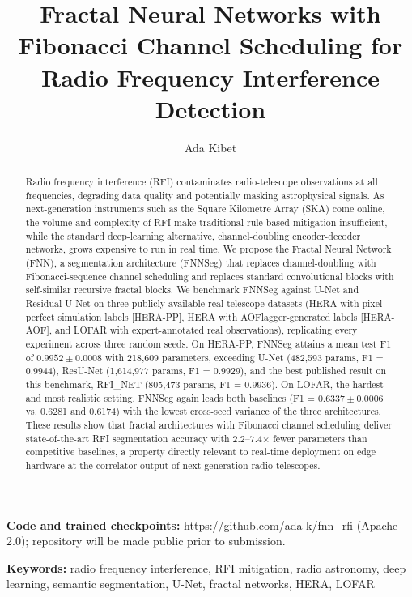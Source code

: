 \documentclass[11pt]{article}
\title{Fractal Neural Networks with Fibonacci Channel Scheduling for Radio Frequency Interference Detection}
\author[1]{Ada Kibet}
\affil[1]{University of East London, u2647143@uel.ac.uk, adakibet@gmail.com, ORCID: \href{https://orcid.org/0009-0002-0809-8738}{0009-0002-0809-8738}}
\date{}
\begin{document}
\maketitle

\noindent \textbf{Code and trained checkpoints:} \url{https://github.com/ada-k/fnn_rfi} (Apache-2.0); repository will be made public prior to submission.

\begin{abstract}
Radio frequency interference (RFI) contaminates radio-telescope observations at all frequencies, degrading data quality and potentially masking astrophysical signals. As next-generation instruments such as the Square Kilometre Array (SKA) come online, the volume and complexity of RFI make traditional rule-based mitigation insufficient, while the standard deep-learning alternative, channel-doubling encoder-decoder networks, grows expensive to run in real time. We propose the Fractal Neural Network (FNN), a segmentation architecture (FNNSeg) that replaces channel-doubling with Fibonacci-sequence channel scheduling and replaces standard convolutional blocks with self-similar recursive fractal blocks. We benchmark FNNSeg against U-Net and Residual U-Net on three publicly available real-telescope datasets (HERA with pixel-perfect simulation labels [HERA-PP], HERA with AOFlagger-generated labels [HERA-AOF], and LOFAR with expert-annotated real observations), replicating every experiment across three random seeds. On HERA-PP, FNNSeg attains a mean test F1 of $0.9952 \pm 0.0008$ with 218,609 parameters, exceeding U-Net (482,593 params, F1 = 0.9944), ResU-Net (1,614,977 params, F1 = 0.9929), and the best published result on this benchmark, RFI\_NET \citep{dutoit2023} (805,473 params, F1 = 0.9936). On LOFAR, the hardest and most realistic setting, FNNSeg again leads both baselines (F1 = $0.6337 \pm 0.0006$ vs. 0.6281 and 0.6174) with the lowest cross-seed variance of the three architectures. These results show that fractal architectures with Fibonacci channel scheduling deliver state-of-the-art RFI segmentation accuracy with 2.2--7.4$\times$ fewer parameters than competitive baselines, a property directly relevant to real-time deployment on edge hardware at the correlator output of next-generation radio telescopes.
\end{abstract}

\noindent \textbf{Keywords:} radio frequency interference, RFI mitigation, radio astronomy, deep learning, semantic segmentation, U-Net, fractal networks, HERA, LOFAR
\end{document}

